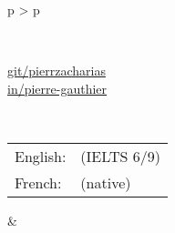 \documentclass[cv]{cv_style}
\begin{document}
{\begin{tabular}{p{\leftsize\textwidth} > {\arraybackslash}p{\rightsize\textwidth}}
\begin{minipage}[t]{\leftsize\textwidth}
        \vspace{-0.5cm}\\
        \begin{flushright}
        \hfill \githubSymbol \hspace{0.5em} \href{http://www.github.com/pierrzacharias}{git/pierrzacharias} \\
        \hfill \linkedinSymbol \hspace{0.5em} 
        \href{https://www.linkedin.com/in/pierre-zacharias-gauthier-293750133/}{in/pierre-gauthier} \\
        \end{flushright}
    \vspace{2cm} \\
    \begin{flushright}
            
            \vspace{-0.4cm}
            \begin{tabular}{m{1.5cm}l}
                {\hspace{.3cm}English}{\hspace{-0.0cm}:} & \hfill {(IELTS 6/9)} \\
                {\hspace{.3cm}French}{\hspace{-0.0cm}:} & \hfill {(native)} 
            \end{tabular}
    \end{flushright}
        
        
   
    
            
    \end{minipage}
&
    \hspace{0.4cm}
    \begin{minipage}[t]{\rightsize\textwidth}
    


\end{minipage}
\end{tabular}}
\end{document}
